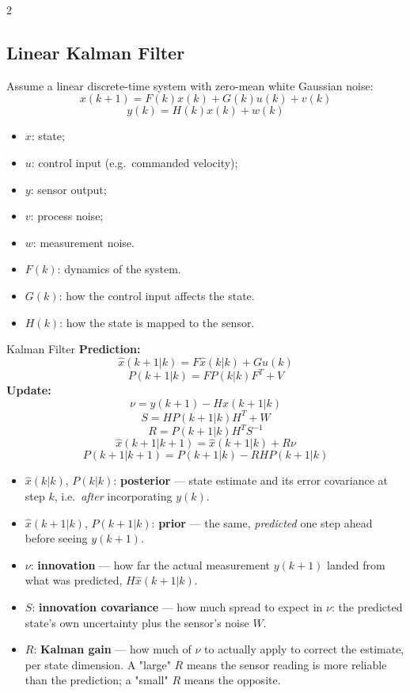 \documentclass[10pt,a4paper]{article}
\newcommand{\keyterm}[1]{\textbf{#1}}
\begin{document}
\begin{multicols}{2}
\subsection{Linear Kalman Filter}
Assume a linear discrete-time system with zero-mean white Gaussian noise:
\[
x(k{+}1)=F(k)x(k)+G(k)u(k)+v(k)
\]
\[
y(k)=H(k)x(k)+w(k)
\]
\begin{itemize}
\item $x$: state; 
\item $u$: control input (e.g.\ commanded velocity); 
\item $y$: sensor output; 
\item $v$: process noise; 
\item $w$: measurement noise.
\item $F(k)$: dynamics of the system.
\item $G(k)$: how the control input affects the state.
\item $H(k)$: how the state is mapped to the sensor.
\end{itemize}

\begin{defbox}{Kalman Filter}
\textbf{Prediction:}
\[
\hat x(k{+}1|k)=F\hat x(k|k)+Gu(k)
\]
\[
P(k{+}1|k)=FP(k|k)F^T+V
\]
\textbf{Update:}
\[
\nu=y(k{+}1)-H\hat x(k{+}1|k)
\]
\[
S=HP(k{+}1|k)H^T+W
\]
\[
R=P(k{+}1|k)H^TS^{-1}
\]
\[
\hat x(k{+}1|k{+}1)=\hat x(k{+}1|k)+R\nu
\]
\[
P(k{+}1|k{+}1)=P(k{+}1|k)-RHP(k{+}1|k)
\]
\end{defbox}
\begin{itemize}
\item $\hat x(k|k)$, $P(k|k)$: \keyterm{posterior} --- state estimate and its error covariance at step $k$, i.e.\ \emph{after} incorporating $y(k)$.
\item $\hat x(k{+}1|k)$, $P(k{+}1|k)$: \keyterm{prior} --- the same, \emph{predicted} one step ahead before seeing $y(k{+}1)$.
\item $\nu$: \keyterm{innovation} --- how far the actual measurement $y(k{+}1)$ landed from what was predicted, $H\hat x(k{+}1|k)$.
\item $S$: \keyterm{innovation covariance} --- how much spread to expect in $\nu$: the predicted state's own uncertainty plus the sensor's noise $W$.
\item $R$: \keyterm{Kalman gain} --- how much of $\nu$ to actually apply to correct the estimate, per state dimension. A "large" $R$ means the sensor reading is more reliable than the prediction; a "small" $R$ means the opposite.
\end{itemize}


\end{multicols}
\end{document}
